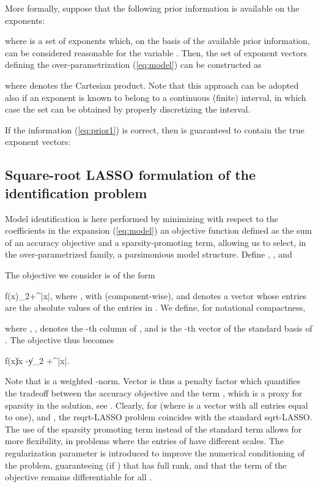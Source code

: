 \documentclass[11pt]{article}
\newcommand{\beq}{}
\begin{document}
More formally, suppose that the following prior information is available
on the exponents:

where  is a set of exponents which, on the basis of the available
prior information, can be considered reasonable for the variable .
Then, the set of exponent vectors defining the over-parametrization
(\ref{eq:model}) can be constructed as

where  denotes the Cartesian product. Note that this approach
can be adopted also if an exponent is known to belong to a continuous
(finite) interval, in which case the set  can be obtained by properly discretizing
the interval.

If the information (\ref{eq:prior1}) is correct, then 
is guaranteed to contain the true exponent vectors:


\subsection{Square-root LASSO formulation of the identification problem}
Model identification is here performed by minimizing with respect to the coefficients 
in the expansion (\ref{eq:model})
an objective function defined as the sum of an accuracy objective
and a sparsity-promoting
term, allowing us to select, in the over-parametrized family, a parsimonious model structure. 
Define
 , ,
and 

The objective we consider is of the form
\beq
f(x)\doteq\left\Vert {}\right\Vert _{2}+\lambda^{\top}\left|x\right|,
\label{eq:f:obj}
\eeq
where ,  
with  (component-wise), and  denotes a vector whose entries are
the absolute values of the entries in .
We define, for notational
compactness, 

where , , denotes the -th column
of , and  is the -th vector of the standard
basis of . The objective thus becomes
\beq
f(x)\doteq \|\tilde \Phi x -\tilde y\|_2 +\lambda^{\top}\left|x\right|.
\eeq

Note that  is  a weighted
-norm. Vector  is thus a penalty factor which
quantifies the tradeoff between the  accuracy objective
 and the term ,
which is a proxy for sparsity in the solution, see \cite{Fuchs05,Tropp06,Donoho06_2,Candes06_2}.
Clearly, for  (where 
is a vector with all entries equal to one), and , the rsqrt-LASSO
problem coincides with the standard sqrt-LASSO. 
The use of the sparsity
promoting term  instead of the standard
term   allows for more flexibility, in problems
where the entries of  have different scales. 
The regularization
parameter   is introduced to improve the numerical conditioning of the problem, guaranteeing
(if ) that  has full rank, and that the  term of the objective remains differentiable for all .
\end{document}
